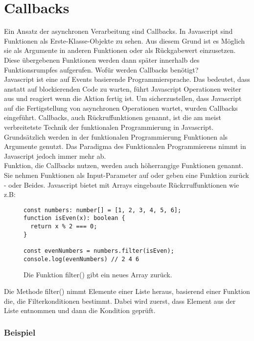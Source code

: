 \section{Callbacks}
Ein Ansatz der asynchronen Verarbeitung sind Callbacks. In Javascript sind Funktionen als Erste-Klasse-Objekte zu sehen. Aus diesem Grund ist es Möglich sie als Argumente in anderen Funktionen oder als Rückgabewert einzusetzen. Diese übergebenen Funktionen werden dann \glqq{}später\grqq{} innerhalb des Funktionsrumpfes aufgerufen. Wofür werden Callbacks benötigt? \\

\noindent
Javascript ist eine auf Events basierende Programmiersprache. Das bedeutet, dass anstatt auf blockierenden Code zu warten, führt Javascript Operationen weiter aus und reagiert wenn die Aktion fertig ist. Um sicherzustellen, dass Javascript auf die Fertigstellung von asynchronen Operationen wartet, wurden Callbacks eingeführt.
Callbacks, auch Rückruffunktionen genannt, ist die am meist verbreitetste Technik der funktionalen Programmierung in Javascript. Grundsätzlich werden in der funktionalen Programmierung Funktionen als Argumente genutzt. Das Paradigma des Funktionalen Programmierens nimmt in Javascript jedoch immer mehr ab.\cite{callbacks-intro}\\

\noindent
Funktion, die Callbacks nutzen, werden auch höherrangige Funktionen genannt. Sie nehmen Funktionen als Input-Parameter auf oder geben eine Funktion zurück - oder Beides. Javascript bietet mit Arrays eingebaute Rückrruffunktionen wie z.B:

\begin{figure}[H]
\begin{lstlisting}
const numbers: number[] = [1, 2, 3, 4, 5, 6];
function isEven(x): boolean { 
  return x % 2 === 0; 
}

const evenNumbers = numbers.filter(isEven);
console.log(evenNumbers) // 2 4 6
\end{lstlisting}
\caption{Die Funktion filter() gibt ein neues Array zurück.\cite{callbacks-example}}
\end{figure}

\noindent
Die Methode filter() nimmt Elemente einer Liste heraus, basierend einer Funktion die, die Filterkonditionen bestimmt. Dabei wird zuerst, dass Element aus der Liste entnommen und dann die Kondition geprüft.

\subsubsection{Beispiel}

